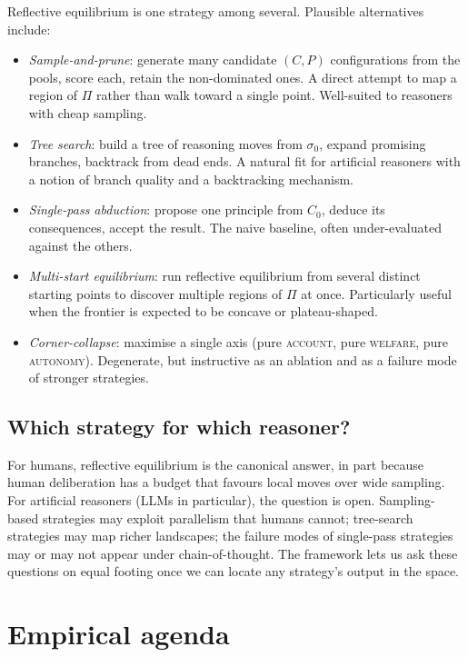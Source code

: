 \documentclass{article}
\begin{document}
Reflective equilibrium is one strategy
among several. Plausible alternatives include:
\begin{itemize}[leftmargin=*, itemsep=2pt]
  \item \emph{Sample-and-prune}: generate many candidate $(C, P)$
    configurations from the pools, score each, retain the non-dominated
    ones. A direct attempt to map a region of $\Pi$ rather than walk
    toward a single point. Well-suited to reasoners with cheap sampling.
  \item \emph{Tree search}: build a tree of reasoning moves from
    $\sigma_0$, expand promising branches, backtrack from dead ends. A
    natural fit for artificial reasoners with a notion of branch quality
    and a backtracking mechanism.
  \item \emph{Single-pass abduction}: propose one principle from $C_0$,
    deduce its consequences, accept the result. The naive baseline,
    often under-evaluated against the others.
  \item \emph{Multi-start equilibrium}: run reflective equilibrium from
    several distinct starting points to discover multiple regions of
    $\Pi$ at once. Particularly useful when the frontier is expected to
    be concave or plateau-shaped.
  \item \emph{Corner-collapse}: maximise a single axis (pure
    \textsc{account}, pure \textsc{welfare}, pure \textsc{autonomy}).
    Degenerate, but instructive as an ablation and as a failure mode of
    stronger strategies.
\end{itemize}

\subsection{Which strategy for which reasoner?}

For humans, reflective
equilibrium is the canonical answer, in part because human deliberation
has a budget that favours local moves over wide sampling. For artificial
reasoners (LLMs in particular), the question is open. Sampling-based
strategies may exploit parallelism that humans cannot; tree-search
strategies may map richer landscapes; the failure modes of single-pass
strategies may or may not appear under chain-of-thought. The framework
lets us ask these questions on equal footing once we can locate any
strategy's output in the space.


\section{Empirical agenda}
\label{sec:empirical}
\end{document}
